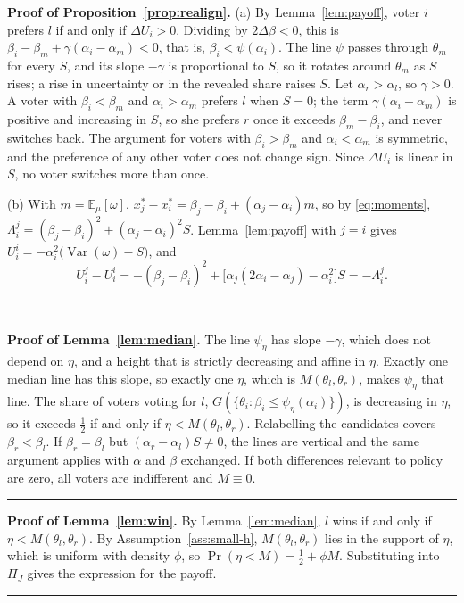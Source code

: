 \documentclass[12pt,letterpaper]{article}
\newenvironment{proof}[1][Proof]{\noindent\textbf{#1.} }{\ \rule{0.5em}{0.5em}}
\begin{document}
\begin{proof}[Proof of Proposition~\ref{prop:realign}]
(a)
By Lemma~\ref{lem:payoff}, voter $i$ prefers $l$ if and only if $\Delta U_i>0$. Dividing by $2\Delta\beta<0$, this is $\beta_i-\beta_m+\gamma(\alpha_i-\alpha_m)<0$, that is, $\beta_i<\psi(\alpha_i)$. The line $\psi$ passes through $\theta_m$ for every $S$, and its slope $-\gamma$ is proportional to $S$, so it rotates around $\theta_m$ as $S$ rises; a rise in uncertainty or in the revealed share raises $S$. Let $\alpha_r>\alpha_l$, so $\gamma>0$. A voter with $\beta_i<\beta_m$ and $\alpha_i>\alpha_m$ prefers $l$ when $S=0$; the term $\gamma(\alpha_i-\alpha_m)$ is positive and increasing in $S$, so she prefers $r$ once it exceeds $\beta_m-\beta_i$, and never switches back. The argument for voters with $\beta_i>\beta_m$ and $\alpha_i<\alpha_m$ is symmetric, and the preference of any other voter does not change sign. Since $\Delta U_i$ is linear in $S$, no voter switches more than once.

(b) With $m=\mathbb{E}_\mu[\omega]$, $x^*_j-x^*_i=\beta_j-\beta_i+(\alpha_j-\alpha_i)m$, so by \eqref{eq:moments}, $\Lambda_i^j=(\beta_j-\beta_i)^2+(\alpha_j-\alpha_i)^2S$. Lemma~\ref{lem:payoff} with $j=i$ gives $U_i^i=-\alpha_i^2\big(\operatorname{Var}(\omega)-S\big)$, and
\[
U_i^j-U_i^i=-(\beta_j-\beta_i)^2+\big[\alpha_j(2\alpha_i-\alpha_j)-\alpha_i^2\big]S=-\Lambda_i^j.
\]
\end{proof}

\begin{proof}[Proof of Lemma~\ref{lem:median}]
The line $\psi_\eta$ has slope $-\gamma$, which does not depend on $\eta$, and a height that is strictly decreasing and affine in $\eta$. Exactly one median line has this slope, so exactly one $\eta$, which is $M(\theta_l,\theta_r)$, makes $\psi_\eta$ that line. The share of voters voting for $l$, $G(\{\theta_i:\beta_i\le\psi_\eta(\alpha_i)\})$, is decreasing in $\eta$, so it exceeds $\tfrac12$ if and only if $\eta<M(\theta_l,\theta_r)$. Relabelling the candidates covers $\beta_r<\beta_l$. If $\beta_r=\beta_l$ but $(\alpha_r-\alpha_l)S\ne0$, the lines are vertical and the same argument applies with $\alpha$ and $\beta$ exchanged. If both differences relevant to policy are zero, all voters are indifferent and $M\equiv0$.
\end{proof}

\begin{proof}[Proof of Lemma~\ref{lem:win}]
By Lemma~\ref{lem:median}, $l$ wins if and only if $\eta<M(\theta_l,\theta_r)$. By Assumption~\ref{ass:small-h}, $M(\theta_l,\theta_r)$ lies in the support of $\eta$, which is uniform with density $\phi$, so $\Pr(\eta<M)=\tfrac12+\phi M$. Substituting into $\Pi_J$ gives the expression for the payoff.
\end{proof}
\end{document}
